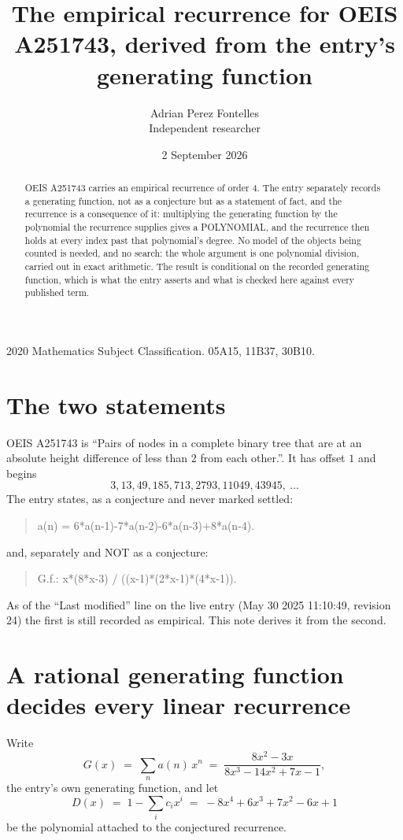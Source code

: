\documentclass[11pt,a4paper]{article}
\title{The empirical recurrence for OEIS A251743, derived from the entry's generating function}
\author{Adrian Perez Fontelles\\ \small Independent researcher}
\date{2 September 2026}
\theoremstyle{plain}
\theoremstyle{definition}
\begin{document}
\maketitle

\begin{abstract}
OEIS A251743 carries an empirical recurrence of order $4$. The entry separately records a
generating function, not as a conjecture but as a statement of fact, and the recurrence is a
consequence of it: multiplying the generating function by the polynomial the recurrence
supplies gives a POLYNOMIAL, and the recurrence then holds at every index past that
polynomial's degree. No model of the objects being counted is needed, and no search: the
whole argument is one polynomial division, carried out in exact arithmetic. The result is
conditional on the recorded generating function, which is what the entry asserts and what is
checked here against every published term.
\end{abstract}

\noindent\small 2020 Mathematics Subject Classification. 05A15, 11B37, 30B10.\normalsize

\section{The two statements}

OEIS A251743 is ``Pairs of nodes in a complete binary tree that are at an absolute height difference of less than 2 from each other.''. It has offset $1$ and begins
\[
3, 13, 49, 185, 713, 2793, 11049, 43945,\ \dots
\]
The entry states, as a conjecture and never marked settled:
\begin{quote}
a(n) = 6*a(n-1)-7*a(n-2)-6*a(n-3)+8*a(n-4).
\end{quote}
and, separately and NOT as a conjecture:
\begin{quote}
G.f.: x*(8*x-3) / ((x-1)*(2*x-1)*(4*x-1)).
\end{quote}
As of the ``Last modified'' line on the live entry (May 30 2025 11:10:49, revision 24) the first is still
recorded as empirical. This note derives it from the second.

\section{A rational generating function decides every linear recurrence}

Write
\[
G(x)\;=\;\sum_{n}a(n)\,x^{n}\;=\;\frac{8 x^{2} - 3 x}{8 x^{3} - 14 x^{2} + 7 x - 1},
\]
the entry's own generating function, and let
\[
D(x)\;=\;1-\sum_i c_i x^{i}\;=\;- 8 x^{4} + 6 x^{3} + 7 x^{2} - 6 x + 1
\]
be the polynomial attached to the conjectured recurrence.
\end{document}
